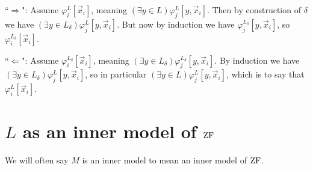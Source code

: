 {``$\Rightarrow$": Assume $\varphi_i^L[\vec{x}_i]$, meaning $(\exists y\in L)\varphi_j^L[y,\vec{x}_i]$. Then by construction of $\delta$ we have $(\exists y\in L_\delta)\varphi_j^L[y,\vec{x}_i]$. But now by induction we have $\varphi_j^{L_\delta}[y,\vec{x}_i]$, so $\varphi_i^{L_\delta}[\vec{x}_i]$.

``$\Leftarrow$": Assume $\varphi_i^{L_\delta}[\vec{x}_i]$, meaning $(\exists y\in L_\delta)\varphi_j^{L_\delta}[y,\vec{x}_i]$. By induction we have $(\exists y\in L_\delta)\varphi_j^L[y,\vec{x}_i]$, so in particular $(\exists y\in L)\varphi_j^L[y,\vec{x}_i]$, which is to say that $\varphi_i^L[\vec{x}_i]$.
}

\section{$L$ as an inner model of $\operatorname{ZF}$}

We will often say $M$ is an inner model to mean an inner model of $\operatorname{ZF}$.

